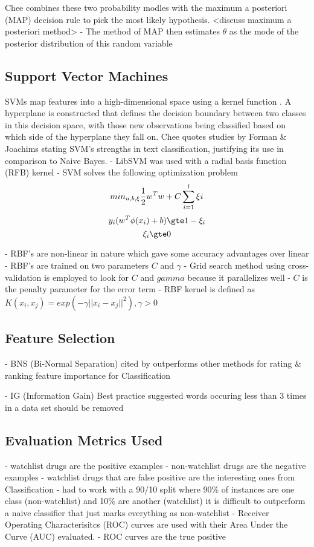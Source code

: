 \documentclass[twoside,11pt]{article}
\begin{document}
Chee combines these two probability modles with the maximum a posteriori (MAP)
decision rule to pick the most likely hypothesis.
<discuss maximum a posteriori method>
- The method of MAP then estimates $\theta$ as the mode of the posterior
distribution of this random variable


\subsection{Support Vector Machines}
SVMs map features into a high-dimensional space using a kernel function \citep{Cortes and Vapnik}.
A hyperplane is constructed that defines the decision boundary between two classes
in this decision space, with those new observations being classified based on which
side of the hyperplane they fall on. Chee quotes studies by Forman & Joachims stating
SVM's strengths in text classification, justifying its use in comparison to Naive
Bayes.
- LibSVM was used with a radial basis function (RFB) kernel
- SVM solves the following optimization problem
\[
  min_{u, b, \xi} \frac{1}{2}w^{T}w + C \sum_{i=1}^{l}\xi i \\
\]
\[
  y_{i}(w^{T}\phi(x_{i}) + b) \gte 1 - \xi_{i}
\]
\[
  \xi_{i} \gte 0
\]

- RBF's are non-linear in nature which gave some accuracy advantages over linear
- RBF's are trained on two parameters $C$ and $\gamma$
- Grid search method using cross-validation is employed to look for $C$ and $gamma$
because it parallelizes well
- $C$ is the penalty parameter for the error term
- RBF kernel is defined as $K(x_i, x_j) = exp(-\gamma||x_i - x_j||^{2}), \gamma > 0$



\subsection{Feature Selection}
- BNS (Bi-Normal Separation) cited by \citep{Forman}
outperforms other methods for rating & ranking feature importance for Classification

- IG (Information Gain)
Best practice suggested words occuring less than 3 times in a data set should be removed

\subsection{Evaluation Metrics Used}
- watchlist drugs are the positive examples
- non-watchlist drugs are the negative examples
- watchlist drugs that are false positive are the interesting ones from Classification
- had to work with a 90/10 split where 90\% of instances are one class (non-watchlist) and 10\% are another
(watchlist) it is difficult to outperform a naive classifier that just marks everything as non-watchlist
- Receiver Operating Characterisitcs (ROC) curves are used with their Area Under the Curve (AUC)
evaluated.
- ROC curves are the true positive
\end{document}
